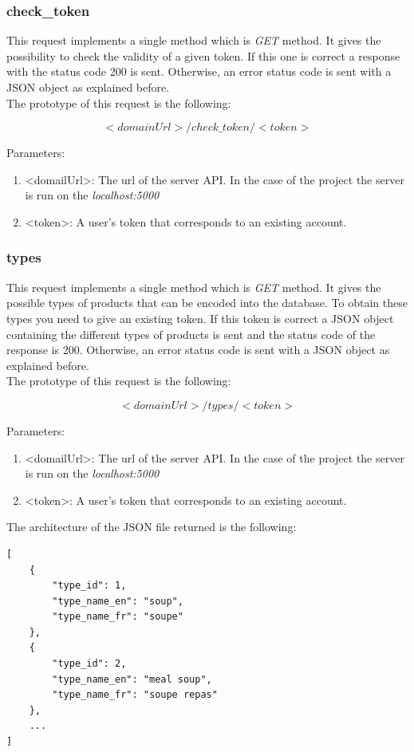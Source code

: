 \subsubsection{check\_token}
This request implements a single method which is \textit{GET} method. It gives the possibility to check the validity of a given token. If this one is correct a response with the status code 200 is sent. Otherwise, an error status code is sent with a JSON object as explained before.\\

The prototype of this request is the following:

$$<domainUrl>/check\_token/<token>$$

Parameters:
\begin{enumerate}
\item <domailUrl>: The url of the server API. In the case of the project the server is run on the \textit{localhost:5000}
\item <token>: A user's token that corresponds to an existing account.
\end{enumerate}

\subsubsection{types}
This request implements a single method which is \textit{GET} method. It gives the possible types of products that can be encoded into the database. To obtain these types you need to give an existing token. If this token is correct a JSON object containing the different types of products is sent and the status code of the response is 200. Otherwise, an error status code is sent with a JSON object as explained before.\\

The prototype of this request is the following:

$$<domainUrl>/types/<token>$$

Parameters:
\begin{enumerate}
\item <domailUrl>: The url of the server API. In the case of the project the server is run on the \textit{localhost:5000}
\item <token>: A user's token that corresponds to an existing account.
\end{enumerate}

The architecture of the JSON file returned is the following:
\begin{lstlisting}
[
    {
        "type_id": 1,
        "type_name_en": "soup",
        "type_name_fr": "soupe"
    },
    {
        "type_id": 2,
        "type_name_en": "meal soup",
        "type_name_fr": "soupe repas"
    },
    ...
]
\end{lstlisting}

